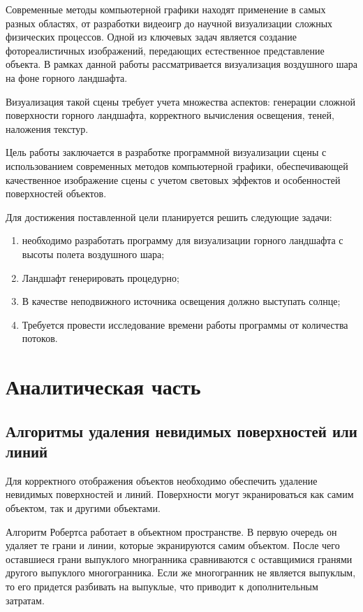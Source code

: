

\usepackage{hyperref}


\setcounter{page}{2}
\renewcommand{\contentsname}{\hfill СОДЕРЖАНИЕ \hfill}
\tableofcontents

Современные методы компьютерной графики находят применение в самых разных областях, от разработки видеоигр до научной визуализации сложных физических процессов. Одной из ключевых задач является создание фотореалистичных изображений, передающих естественное представление объекта. В рамках данной работы рассматривается визуализация воздушного шара на фоне горного ландшафта.

Визуализация такой сцены требует учета множества аспектов: генерации сложной поверхности горного ландшафта, корректного вычисления освещения, теней, наложения текстур.

Цель работы заключается в разработке программной визуализации сцены с использованием современных методов компьютерной графики, обеспечивающей качественное изображение сцены с учетом световых эффектов и особенностей поверхностей объектов. 

Для достижения поставленной цели планируется решить следующие задачи:
\begin{enumerate}
\item необходимо разработать программу для визуализации горного ландшафта с высоты полета воздушного шара;
\item Ландшафт генерировать процедурно;
\item В качестве неподвижного источника освещения должно выступать солнце;
\item Требуется провести исследование времени работы программы от количества потоков.
\end{enumerate}

\chapter{Аналитическая часть}
\section{Алгоритмы удаления невидимых поверхностей или линий}
Для корректного отображения объектов необходимо обеспечить удаление невидимых поверхностей и линий. Поверхности могут экранироваться как самим объектом, так и другими объектами.

Алгоритм Робертса работает в объектном пространстве. В первую очередь он удаляет те грани и линии, которые экранируются самим объектом. После чего оставшиеся грани выпуклого многранника сравниваются с оставщимися гранями другого выпуклого многогранника. Если же многогранник не является выпуклым, то его придется разбивать на выпуклые, что приводит к дополнительным затратам. 


